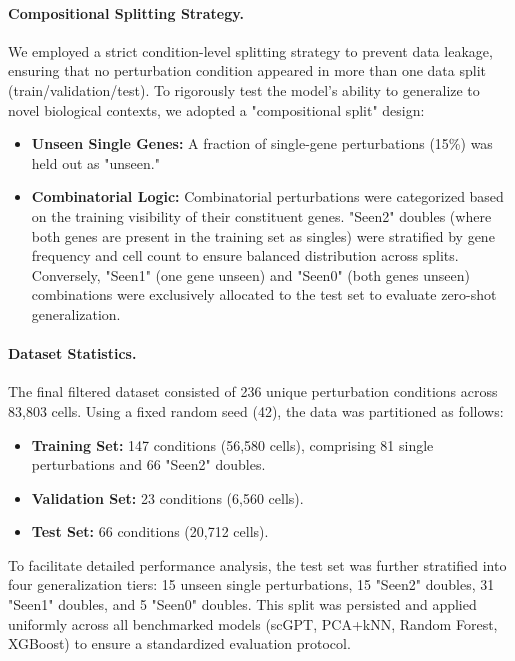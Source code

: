 \documentclass[conference]{IEEEtran}
\begin{document}
\paragraph{Compositional Splitting Strategy.}
We employed a strict condition-level splitting strategy to prevent data leakage, ensuring that no perturbation condition appeared in more than one data split (train/validation/test). To rigorously test the model's ability to generalize to novel biological contexts, we adopted a "compositional split" design:
\begin{itemize}
    \item \textbf{Unseen Single Genes:} A fraction of single-gene perturbations (15\%) was held out as "unseen."
    \item \textbf{Combinatorial Logic:} Combinatorial perturbations were categorized based on the training visibility of their constituent genes. "Seen2" doubles (where both genes are present in the training set as singles) were stratified by gene frequency and cell count to ensure balanced distribution across splits. Conversely, "Seen1" (one gene unseen) and "Seen0" (both genes unseen) combinations were exclusively allocated to the test set to evaluate zero-shot generalization.
\end{itemize}

\paragraph{Dataset Statistics.}
The final filtered dataset consisted of 236 unique perturbation conditions across 83,803 cells. Using a fixed random seed (42), the data was partitioned as follows:
\begin{itemize}
    \item \textbf{Training Set:} 147 conditions (56,580 cells), comprising 81 single perturbations and 66 "Seen2" doubles.
    \item \textbf{Validation Set:} 23 conditions (6,560 cells).
    \item \textbf{Test Set:} 66 conditions (20,712 cells).
\end{itemize}
To facilitate detailed performance analysis, the test set was further stratified into four generalization tiers: 15 unseen single perturbations, 15 "Seen2" doubles, 31 "Seen1" doubles, and 5 "Seen0" doubles. This split was persisted and applied uniformly across all benchmarked models (scGPT, PCA+kNN, Random Forest, XGBoost) to ensure a standardized evaluation protocol. 
\end{document}
